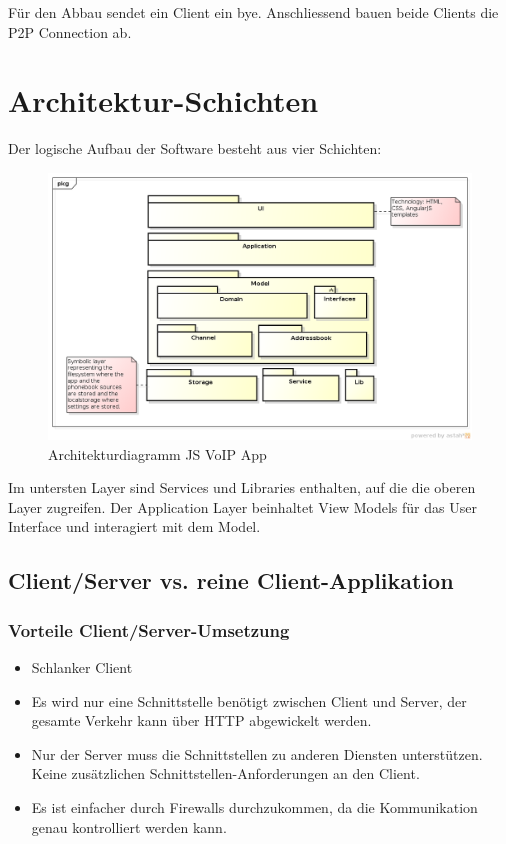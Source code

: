 	Für den Abbau sendet ein Client ein bye. Anschliessend bauen beide Clients die P2P Connection ab.

\section{Architektur-Schichten}
	Der logische Aufbau der Software besteht aus vier Schichten:
	\begin{figure}[H]
		\centering
		\includegraphics[width=1\textwidth]{../architekturanalayse/img/architecture.png}
		\caption{Architekturdiagramm JS VoIP App}
	\end{figure}
	Im untersten Layer sind Services und Libraries enthalten, auf die die oberen Layer zugreifen.
	Der Application Layer beinhaltet View Models für das User Interface und interagiert mit dem Model. 

	\subsection{Client/Server vs. reine Client-Applikation}
		\subsubsection{Vorteile Client/Server-Umsetzung}
		\begin{itemize}
			\item Schlanker Client
			\item Es wird nur eine Schnittstelle benötigt zwischen Client und Server, der gesamte Verkehr kann über HTTP abgewickelt werden.
			\item Nur der Server muss die Schnittstellen zu anderen Diensten
			unterstützen. Keine zusätzlichen Schnittstellen-Anforderungen an den Client.
			\item Es ist einfacher durch Firewalls durchzukommen, da die Kommunikation genau kontrolliert werden kann.
		\end{itemize}
